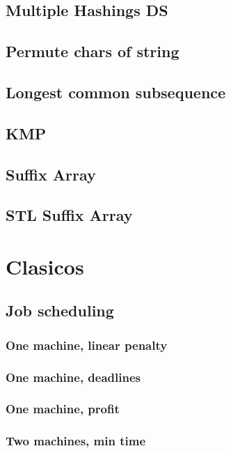 \subsection{Multiple Hashings DS}
\subsection{Permute chars of string}
\subsection{Longest common subsequence}
\subsection{KMP}
\subsection{Suffix Array}
\subsection{STL Suffix Array}
\section{Clasicos}
\subsection{Job scheduling}
\subsubsection{One machine, linear penalty}
\subsubsection{One machine, deadlines}
\subsubsection{One machine, profit}
\subsubsection{Two machines, min time}

